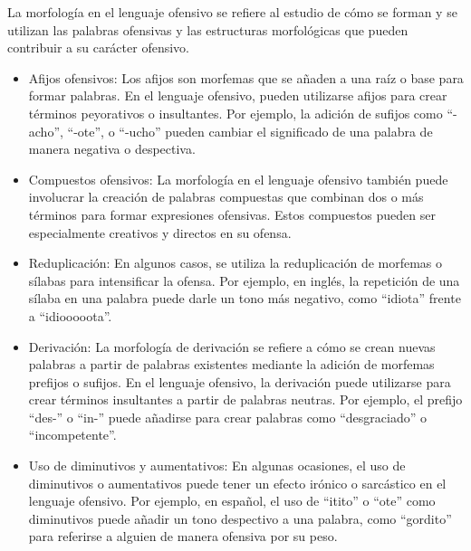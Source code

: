 La morfología en el lenguaje ofensivo se refiere al estudio de cómo se forman y se utilizan las palabras ofensivas y las estructuras morfológicas que pueden contribuir a su carácter ofensivo.

\begin{itemize}

	\item Afijos ofensivos: Los afijos son morfemas que se añaden a una raíz o base para formar palabras. En el lenguaje ofensivo, pueden utilizarse afijos para crear términos peyorativos o insultantes. Por ejemplo, la adición de sufijos como ``-acho'', ``-ote'', o ``-ucho'' pueden cambiar el significado de una palabra de manera negativa o despectiva.
	
	\item Compuestos ofensivos: La morfología en el lenguaje ofensivo también puede involucrar la creación de palabras compuestas que combinan dos o más términos para formar expresiones ofensivas. Estos compuestos pueden ser especialmente creativos y directos en su ofensa.
	
	\item Reduplicación: En algunos casos, se utiliza la reduplicación de morfemas o sílabas para intensificar la ofensa. Por ejemplo, en inglés, la repetición de una sílaba en una palabra puede darle un tono más negativo, como ``idiota'' frente a ``idiooooota''.
	
	\item Derivación: La morfología de derivación se refiere a cómo se crean nuevas palabras a partir de palabras existentes mediante la adición de morfemas prefijos o sufijos. En el lenguaje ofensivo, la derivación puede utilizarse para crear términos insultantes a partir de palabras neutras. Por ejemplo, el prefijo ``des-'' o ``in-'' puede añadirse para crear palabras como ``desgraciado'' o ``incompetente''.
	
	\item Uso de diminutivos y aumentativos: En algunas ocasiones, el uso de diminutivos o aumentativos puede tener un efecto irónico o sarcástico en el lenguaje ofensivo. Por ejemplo, en español, el uso de ``itito'' o ``ote'' como diminutivos puede añadir un tono despectivo a una palabra, como ``gordito'' para referirse a alguien de manera ofensiva por su peso.
\end{itemize}